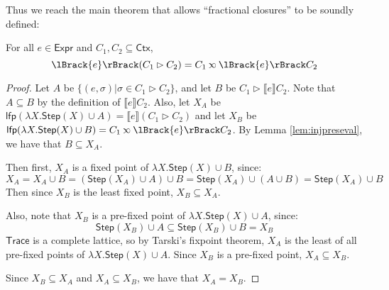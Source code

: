 \documentclass[acmsmall,screen,review]{acmart}\settopmatter{printfolios=true,printccs=false,printacmref=false}
\theoremstyle{acmdefinition}
\newcommand*{\Expr}{\mathsf{Expr}}
\newcommand*{\ctx}{\sigma}
\newcommand*{\Ctx}{\mathsf{Ctx}}
\newcommand*{\Trace}{\mathsf{Trace}}
\newcommand*{\lfp}{\mathsf{lfp}}
\newcommand*{\Step}{\mathsf{Step}}
\newcommand*{\semlink}{\mathbin{\rotatebox[origin=c]{180}{$\propto$}}}
\newcommand*{\sembracket}[1]{\lBrack{#1}\rBrack}
\begin{document}
Thus we reach the main theorem that allows ``fractional closures'' to be soundly defined:
\begin{theorem}[Advance]
  For all $e\in\Expr$ and $C_1,C_2\subseteq\Ctx$,
  \[\sembracket{e}(C_1\rhd C_2)=C_1\semlink\sembracket{e}C_2\]
\end{theorem}
\begin{proof}
  Let $A$ be $\{(e,\ctx)|\ctx\in C_1\rhd C_2\}$, and let $B$ be $C_1\rhd\sembracket{e}C_2$.
  Note that $A\subseteq B$ by the definition of $\sembracket{e}C_2$.
  Also, let $X_A$ be $\lfp(\lambda X.\Step(X)\cup A)=\sembracket{e}(C_1\rhd C_2)$ and let $X_B$ be $\lfp(\lambda X.\Step(X)\cup B)=C_1\semlink\sembracket{e}C_2$.
  By Lemma \ref{lem:injpreseval}, we have that $B\subseteq X_A$.

  Then first, $X_A$ is a fixed point of $\lambda X.\Step(X)\cup B$, since:
  \[X_A=X_A\cup B=(\Step(X_A)\cup A)\cup B=\Step(X_A)\cup(A\cup B)=\Step(X_A)\cup B\]
  Then since $X_B$ is the least fixed point, $X_B\subseteq X_A$.

  Also, note that $X_B$ is a pre-fixed point of $\lambda X.\Step(X)\cup A$, since:
  \[\Step(X_B)\cup A\subseteq\Step(X_B)\cup B=X_B\]
  $\Trace$ is a complete lattice, so by Tarski's fixpoint theorem, $X_A$ is the least of all pre-fixed points of $\lambda X.\Step(X)\cup A$.
  Since $X_B$ is a pre-fixed point, $X_A\subseteq X_B$.

  Since $X_B\subseteq X_A$ and $X_A\subseteq X_B$, we have that $X_A=X_B$.
\end{proof}
\end{document}
